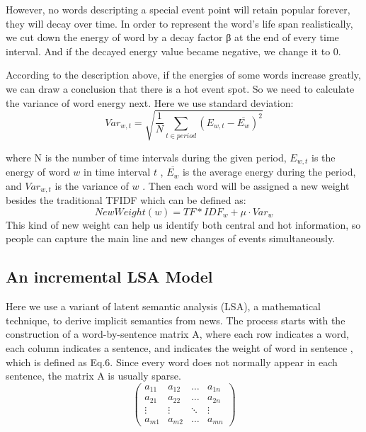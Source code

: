 \documentclass[runningheads,a4paper]{llncs}
\begin{document}
However, no words descripting a special event point will retain popular forever, they will decay over time. In order to represent the word's life span realistically, we cut down the energy of word by a decay factor β at the end of every time interval. And if the decayed energy value became negative, we change it to 0.

According to the description above, if the energies of some words increase greatly, we can draw a conclusion that there is a hot event spot. So we need to calculate the variance of word energy next. Here we use standard deviation:
\begin{equation}
Var_{w,t} = \sqrt{ \frac{1}{N} \sum_{t \in period}(E_{w,t}- \overline{E_{w}})^2}
\end{equation}

where N is the number of time intervals during the given period, $E_{w,t}$  is the energy of word $w$  in time interval $t$ , $\overline{E_{w}}$  is the average energy during the period, and $Var_{w,t}$  is the variance of $w$ .
Then each word will be assigned a new weight besides the traditional TFIDF which can be defined as:
 \begin{equation}
NewWeight(w)=TF*IDF_{w} + \mu \cdot Var_{w}
\end{equation}
This kind of new weight can help us identify both central and hot information, so people can capture the main line and new changes of events simultaneously.

\subsection{An incremental LSA Model}
Here we use a variant of latent semantic analysis (LSA), a mathematical technique, to derive implicit semantics from news. The process starts with the construction of a word-by-sentence matrix A, where each row indicates a word, each column indicates a sentence, and   indicates the weight of word   in sentence , which is defined as Eq.6. Since every word does not normally appear in each sentence, the matrix A is usually sparse.
\begin{displaymath}
\left( \begin{array}{cccc}
a_{11} & a_{12} & \ldots & a_{1n} \\
a_{21} & a_{22} & \ldots & a_{2n} \\
\vdots & \vdots & \ddots & \vdots \\
a_{m1} & a_{m2} & \ldots & a_{mn}
\end{array} \right)
\end{displaymath}
\end{document}
